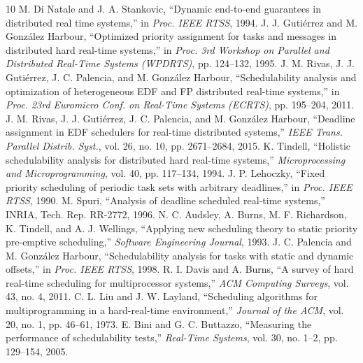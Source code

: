 \documentclass[conference]{IEEEtran}
\begin{document}
\begin{thebibliography}{10}
 M. Di Natale and J. A. Stankovic, ``Dynamic end-to-end
guarantees in distributed real time systems,'' in \emph{Proc. IEEE RTSS}, 1994.
 J. J. Guti\'errez and M. Gonz\'alez Harbour, ``Optimized priority
assignment for tasks and messages in distributed hard real-time systems,'' in
\emph{Proc. 3rd Workshop on Parallel and Distributed Real-Time Systems (WPDRTS)},
pp. 124--132, 1995.
 J. M. Rivas, J. J. Guti\'errez, J. C. Palencia, and M. Gonz\'alez
Harbour, ``Schedulability analysis and optimization of heterogeneous {EDF} and {FP}
distributed real-time systems,'' in \emph{Proc. 23rd Euromicro Conf. on Real-Time
Systems (ECRTS)}, pp. 195--204, 2011.
 J. M. Rivas, J. J. Guti\'errez, J. C. Palencia, and M.
Gonz\'alez Harbour, ``Deadline assignment in {EDF} schedulers for real-time
distributed systems,'' \emph{IEEE Trans. Parallel Distrib. Syst.}, vol. 26,
no. 10, pp. 2671--2684, 2015.
 K. Tindell, ``Holistic schedulability analysis for distributed
hard real-time systems,'' \emph{Microprocessing and Microprogramming}, vol. 40,
pp. 117--134, 1994.
 J. P. Lehoczky, ``Fixed priority scheduling of periodic task
sets with arbitrary deadlines,'' in \emph{Proc. IEEE RTSS}, 1990.
 M. Spuri, ``Analysis of deadline scheduled real-time systems,''
INRIA, Tech. Rep. RR-2772, 1996.
 N. C. Audsley, A. Burns, M. F. Richardson, K. Tindell, and
A. J. Wellings, ``Applying new scheduling theory to static priority pre-emptive
scheduling,'' \emph{Software Engineering Journal}, 1993.
 J. C. Palencia and M. Gonz\'alez Harbour, ``Schedulability
analysis for tasks with static and dynamic offsets,'' in \emph{Proc. IEEE RTSS},
1998.
 R. I. Davis and A. Burns, ``A survey of hard real-time scheduling
for multiprocessor systems,'' \emph{ACM Computing Surveys}, vol. 43, no. 4, 2011.
 C. L. Liu and J. W. Layland, ``Scheduling algorithms for
multiprogramming in a hard-real-time environment,'' \emph{Journal of the ACM},
vol. 20, no. 1, pp. 46--61, 1973.
 E. Bini and G. C. Buttazzo, ``Measuring the performance of
schedulability tests,'' \emph{Real-Time Systems}, vol. 30, no. 1--2, pp. 129--154,
2005.
\end{thebibliography}
\end{document}
